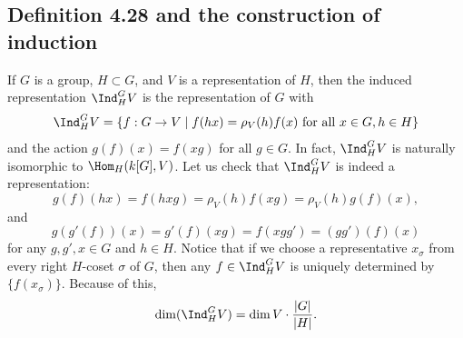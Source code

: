 
\subsection*{Definition 4.28 and the construction of induction}
If $G$ is a group, $H\subset G$, and $V$ is a representation of $H$, then the induced representation $\Ind_H^G V$ is the representation of $G$ with
\[
\Ind_H^G V=\{f:G\to V\mid f(hx)=\rho_V(h)f(x)\text{ for all }x\in G,h\in H\}
\]
and the action $g(f)(x)=f(xg)$ for all $g\in G$.
In fact, $\Ind_H^G V$ is naturally isomorphic to $\Hom_H(k[G],V)$.
Let us check that $\Ind_H^G V$ is indeed a representation:
\[
g(f)(hx)=f(hxg)=\rho_V(h)f(xg)=\rho_V(h)g(f)(x),
\]
and
\[
g(g'(f))(x)=g'(f)(xg)=f(xgg')=(gg')(f)(x)
\]
for any $g,g',x\in G$ and $h\in H$.
Notice that if we choose a representative $x_\sigma$ from every right $H$-coset $\sigma$ of $G$, then any $f\in\Ind_H^G V$ is uniquely determined by $\{f(x_\sigma)\}$. Because of this,
\[
\dim(\Ind_H^G V)=\dim V\cdot\frac{|G|}{|H|}.
\]

